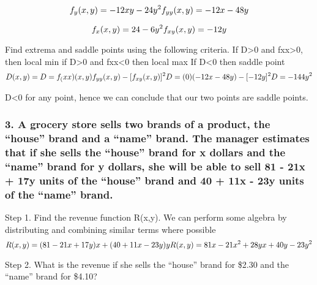 \documentclass[
]{article}
\begin{document}
\[
f_{y}(x, y)=-12xy-24y^{2}\\
f_{yy}(x, y)=-12x-48y
\]

\[
f_{x}(x, y)=24-6y^{2}\\
f_{xy}(x, y)=-12y
\]

Find extrema and saddle points using the following criteria. If
D\textgreater0 and fxx\textgreater0, then local min if D\textgreater0
and fxx\textless0 then local max If D\textless0 then saddle point \[
D(x,y)=D=f_(xx)(x,y)f_{yy}(x,y)-[f_{xy}(x, y)]^{2}\\
D=(0)(-12x-48y)-[-12y]^{2}\\
D=-144y^{2}
\]

D\textless0 for any point, hence we can conclude that our two points are
saddle points.

\hypertarget{a-grocery-store-sells-two-brands-of-a-product-the-house-brand-and-a-name-brand.-the-manager-estimates-that-if-she-sells-the-house-brand-for-x-dollars-and-the-name-brand-for-y-dollars-she-will-be-able-to-sell-81---21x-17y-units-of-the-house-brand-and-40-11x---23y-units-of-the-name-brand.}{%
\subsubsection{3. A grocery store sells two brands of a product, the
``house'' brand and a ``name'' brand. The manager estimates that if she
sells the ``house'' brand for x dollars and the ``name'' brand for y
dollars, she will be able to sell 81 - 21x + 17y units of the ``house''
brand and 40 + 11x - 23y units of the ``name''
brand.}\label{a-grocery-store-sells-two-brands-of-a-product-the-house-brand-and-a-name-brand.-the-manager-estimates-that-if-she-sells-the-house-brand-for-x-dollars-and-the-name-brand-for-y-dollars-she-will-be-able-to-sell-81---21x-17y-units-of-the-house-brand-and-40-11x---23y-units-of-the-name-brand.}}

Step 1. Find the revenue function R(x,y). We can perform some algebra by
distributing and combining similar terms where possible \[
 R(x,y) = (81- 21x + 17y)x + (40 + 11x - 23y)y\\
 R(x, y)=81x - 21x^2 + 28yx + 40y - 23y^2
\]

Step 2. What is the revenue if she sells the ``house'' brand for \$2.30
and the ``name'' brand for \$4.10?
\end{document}
